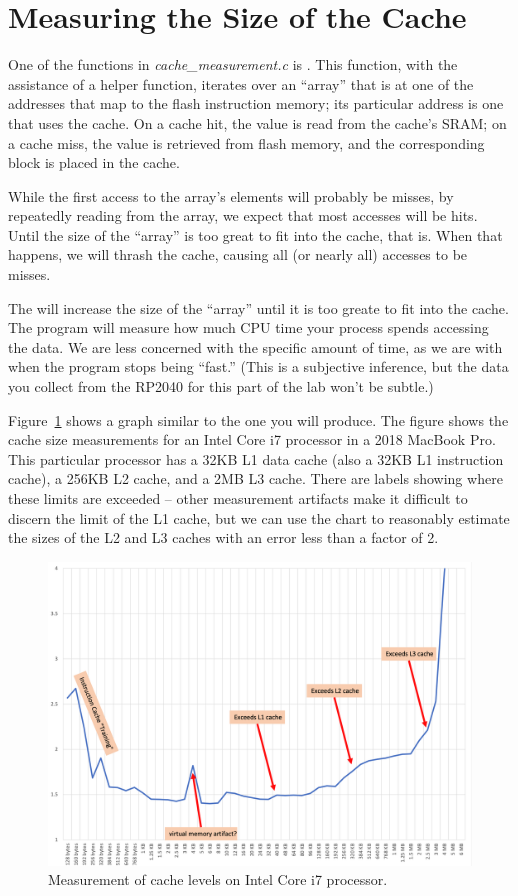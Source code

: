 \section{Measuring the Size of the Cache}

One of the functions in \textit{cache\_measurement.c} is .
This function, with the assistance of a helper function, iterates over an ``array'' that  is at one of the addresses that map to the flash instruction memory;
its particular address is one that uses the cache.
On a cache hit, the value is read from the cache's SRAM;
on a cache miss, the value is retrieved from flash memory, and the corresponding block is placed in the cache.

While the first access to the array's elements will probably be misses,
by repeatedly reading from the array, we expect that most accesses will be hits.
Until the size of the ``array'' is too great to fit into the cache, that is.
When that happens, we will thrash the cache, causing all (or nearly all) accesses to be misses.

The  will increase the size of the ``array'' until it is too greate to fit into the cache.
The program will measure how much CPU time your process spends accessing the data.
We are less concerned with the specific amount of time, as we are with when the program stops being ``fast.''
(This is a subjective inference, but the data you collect from the RP2040 for this part of the lab won't be subtle.)

Figure~\ref{fig:LaptopCache} shows a graph similar to the one you will produce.
The figure shows the cache size measurements for an Intel Core i7 processor in a 2018 MacBook Pro.
This particular processor has a 32KB L1 data cache (also a 32KB L1 instruction cache), a 256KB L2 cache, and a 2MB L3 cache.
There are labels showing where these limits are exceeded -- other measurement artifacts make it difficult to discern the limit of the L1 cache, but we can use the chart to reasonably estimate the sizes of the L2 and L3 caches with an error less than a factor of 2.

\begin{figure}
    \centering
    \includegraphics[width=13cm]{IntelI7caches}
    \caption{Measurement of cache levels on Intel Core i7 processor. \label{fig:LaptopCache}}
\end{figure}

